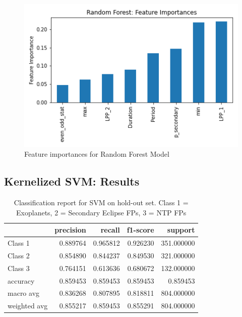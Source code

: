 \documentclass{article}
\begin{document}
  \begin{figure}[H]
	\begin{center}
		\includegraphics[totalheight=6cm]{figures/randforest_feature_imp.png}
	\end{center}
	\caption{Feature importances for Random Forest Model}
\end{figure}
\subsection{Kernelized SVM: Results}

\begin{table}[H]
	\begin{center}
\begin{tabular}{l|r|r|r|r}

	{} &  precision &    recall &  f1-score &     support \\ \hline

	Class 1            &   0.889764 &  0.965812 &  0.926230 &  351.000000 \\ \hline
	Class 2            &   0.854890 &  0.844237 &  0.849530 &  321.000000 \\ \hline
	Class 3            &   0.764151 &  0.613636 &  0.680672 &  132.000000 \\ \hline
	accuracy     &   0.859453 &  0.859453 &  0.859453 &    0.859453 \\ \hline
	macro avg    &   0.836268 &  0.807895 &  0.818811 &  804.000000 \\ \hline
	weighted avg &   0.855217 &  0.859453 &  0.855291 &  804.000000 \\ \hline

\end{tabular}
\end{center}
\caption{Classification report for SVM on hold-out set. Class 1 = Exoplanets, 2 = Secondary Eclipse FPs, 3 = NTP FPs}
\end{table}
\end{document}
